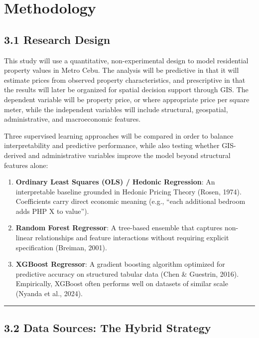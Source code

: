 \section{Methodology}\label{methodology}

\subsection{\texorpdfstring{\textbf{3.1 Research Design}}{3.1 Research Design}}\label{research-design}

This study will use a quantitative, non-experimental design to model residential property values in Metro Cebu. The analysis will be predictive in that it will estimate prices from observed property characteristics, and prescriptive in that the results will later be organized for spatial decision support through GIS. The dependent variable will be property price, or where appropriate price per square meter, while the independent variables will include structural, geospatial, administrative, and macroeconomic features.

Three supervised learning approaches will be compared in order to balance interpretability and predictive performance, while also testing whether GIS-derived and administrative variables improve the model beyond structural features alone:

\begin{enumerate}
\item \textbf{Ordinary Least Squares (OLS) / Hedonic Regression}: An interpretable baseline grounded in Hedonic Pricing Theory (Rosen, 1974). Coefficients carry direct economic meaning (e.g., ``each additional bedroom adds PHP X to value'').
\item \textbf{Random Forest Regressor}: A tree-based ensemble that captures non-linear relationships and feature interactions without requiring explicit specification (Breiman, 2001).
\item \textbf{XGBoost Regressor}: A gradient boosting algorithm optimized for predictive accuracy on structured tabular data (Chen \& Guestrin, 2016). Empirically, XGBoost often performs well on datasets of similar scale (Nyanda et al., 2024).
\end{enumerate}

\begin{center}\rule{0.5\linewidth}{0.5pt}\end{center}

\subsection{\texorpdfstring{\textbf{3.2 Data Sources: The Hybrid Strategy}}{3.2 Data Sources: The Hybrid Strategy}}\label{data-sources-the-hybrid-strategy}

